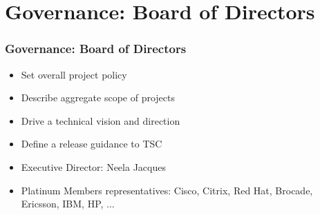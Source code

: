 \section{Governance: Board of Directors}

\begin{frame}[allowframebreaks]
\frametitle{Governance: Board of Directors}

\begin{itemize}
 \item Set overall project policy
 \item Describe aggregate scope of projects
 \item Drive a technical vision and direction
 \item Define a release guidance to TSC
 \item Executive Director: Neela Jacques
 \item Platinum Members representatives: Cisco, Citrix, Red Hat, Brocade, Ericsson, IBM, HP, ...
\end{itemize}

\end{frame}
